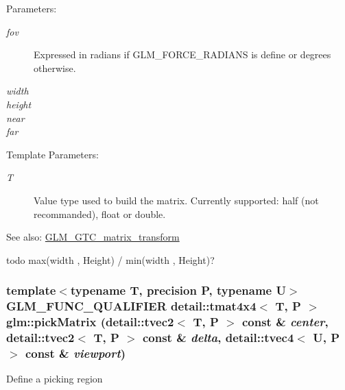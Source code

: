 \begin{Desc}
\item[Parameters:]
\begin{description}
\item[{\em fov}]Expressed in radians if GLM\_\-FORCE\_\-RADIANS is define or degrees otherwise. \item[{\em width}]\item[{\em height}]\item[{\em near}]\item[{\em far}]\end{description}
\end{Desc}
\begin{Desc}
\item[Template Parameters:]
\begin{description}
\item[{\em T}]Value type used to build the matrix. Currently supported: half (not recommanded), float or double. \end{description}
\end{Desc}
\begin{Desc}
\item[See also:]\hyperlink{group__gtc__matrix__transform}{GLM\_\-GTC\_\-matrix\_\-transform} \end{Desc}


todo max(width , Height) / min(width , Height)? \hypertarget{group__gtc__matrix__transform_g42972db8a1c73829999a8454d11fa4a3}{
\subsubsection[pickMatrix]{\setlength{\rightskip}{0pt plus 5cm}template$<$typename T, precision P, typename U$>$ GLM\_\-FUNC\_\-QUALIFIER detail::tmat4x4$<$ T, P $>$ glm::pickMatrix (detail::tvec2$<$ T, P $>$ const \& {\em center}, \/  detail::tvec2$<$ T, P $>$ const \& {\em delta}, \/  detail::tvec4$<$ U, P $>$ const \& {\em viewport})}}
\label{group__gtc__matrix__transform_g42972db8a1c73829999a8454d11fa4a3}


Define a picking region

